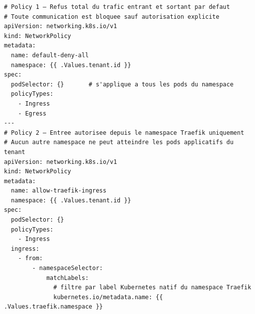 \begin{longlisting}
\begin{mdframed}[
  linecolor=gray!40,
  backgroundcolor=gray!5,
  linewidth=0.5pt,
  innerleftmargin=6pt,
  innerrightmargin=6pt,
  innertopmargin=6pt,
  innerbottommargin=6pt,
  nobreak=false
]
\begin{verbatim}
# Policy 1 — Refus total du trafic entrant et sortant par defaut
# Toute communication est bloquee sauf autorisation explicite
apiVersion: networking.k8s.io/v1
kind: NetworkPolicy
metadata:
  name: default-deny-all
  namespace: {{ .Values.tenant.id }}
spec:
  podSelector: {}       # s'applique a tous les pods du namespace
  policyTypes:
    - Ingress
    - Egress
---
# Policy 2 — Entree autorisee depuis le namespace Traefik uniquement
# Aucun autre namespace ne peut atteindre les pods applicatifs du tenant
apiVersion: networking.k8s.io/v1
kind: NetworkPolicy
metadata:
  name: allow-traefik-ingress
  namespace: {{ .Values.tenant.id }}
spec:
  podSelector: {}
  policyTypes:
    - Ingress
  ingress:
    - from:
        - namespaceSelector:
            matchLabels:
              # filtre par label Kubernetes natif du namespace Traefik
              kubernetes.io/metadata.name: {{ .Values.traefik.namespace }}
\end{verbatim}
\end{mdframed}
\caption{Template NetworkPolicy (Partie 1) --- Isolation par defaut et
         autorisation d'entree depuis Traefik uniquement
         (\texttt{tenant-chart/templates/networkpolicy.yaml})}
\label{lst:networkpolicy-1}
\end{longlisting}

